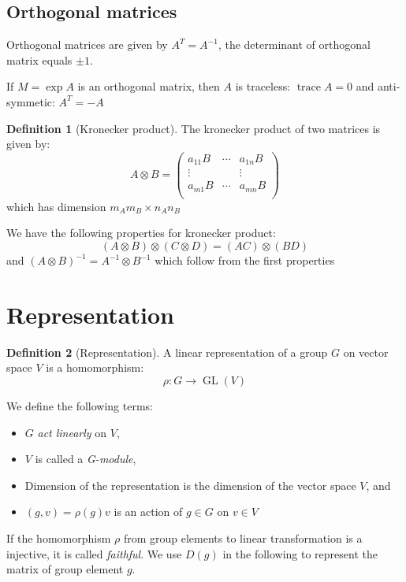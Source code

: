 \documentclass{amsart}
\theoremstyle{remark}
\theoremstyle{remark}
\theoremstyle{definition}
\newtheorem*{definition}{Definition}
\DeclareMathOperator{\GL}{GL}
\DeclareMathOperator{\Tr}{trace}
\begin{document}
\subsection*{Orthogonal matrices}
Orthogonal matrices are given by $A^T = A^{-1}$, the determinant of orthogonal
matrix equals $\pm 1$. 

If $M = \exp A$ is an orthogonal matrix, then $A$ is traceless: $\Tr A = 0$ and 
anti-symmetic: $A^T = -A$

\vspace{10pt}

\begin{definition}
    [Kronecker product]
    The kronecker product of two matrices is given by:
    \begin{equation*}
        A \otimes B = \left( \begin{matrix}
            a_{11}B & \cdots & a_{1n}B \\
            \vdots &   & \vdots \\
            a_{m1}B & \cdots & a_{mn}B \\
        \end{matrix} \right)
    \end{equation*}
    which has dimension $m_Am_B\times n_An_B$
\end{definition}

We have the following properties for kronecker product:
\begin{equation*}
    (A\otimes B) \otimes (C \otimes D) = (AC) \otimes (BD)
\end{equation*}
and $(A\otimes B)^{-1} = A^{-1} \otimes B^{-1}$
which follow from the first properties

\section*{Representation}

\begin{definition}
    [Representation]
    A linear representation of a group $G$ on vector space $V$ is a homomorphism:
    \[\rho\colon G\to \GL(V)\]
\end{definition}
We define the following terms:
\begin{itemize}
    \item $G$ \emph{act linearly} on $V$,
    \item $V$ is called a \emph{G-module},
    \item Dimension of the representation is the dimension of the vector space $V$, and
    \item $(g,v)=\rho(g)v$ is an action of $g\in G$ on $v\in V$ 
\end{itemize}
If the homomorphism $\rho$ from group elements to linear transformation is a injective, 
it is called \emph{faithful}. We use $D(g)$ in the following to represent the matrix 
of group element $g$.
\end{document}
